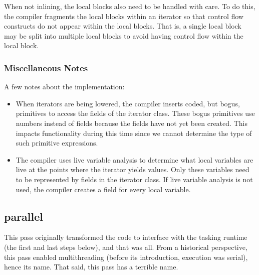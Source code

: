 \documentclass[10pt]{article}
\begin{document}
When not inlining, the local blocks also need to be handled with care.
To do this, the compiler fragments the local blocks within an iterator
so that control flow constructs do not appear within the local blocks.
That is, a single local block may be split into multiple local blocks
to avoid having control flow within the local block.

\subsubsection{Miscellaneous Notes}

A few notes about the implementation:
\begin{itemize}
\item When iterators are being lowered, the compiler inserts coded,
  but bogus,  primitives to access the fields of the
  iterator class.  These bogus primitives use numbers instead of
  fields because the fields have not yet been created.  This impacts
  functionality during this time since we cannot determine the type of
  such primitive expressions.
\item The compiler uses live variable analysis to determine what local
  variables are live at the points where the iterator yields values.
  Only these variables need to be represented by fields in the
  iterator class.  If live variable analysis is not used, the compiler
  creates a field for every local variable.
\end{itemize}

\subsection{parallel}

This pass originally transformed the code to interface with the
tasking runtime (the first and last steps below), and that was all.
From a historical perspective, this pass enabled multithreading
(before its introduction, execution was serial), hence its name.  That
said, this pass has a terrible name.
\end{document}
